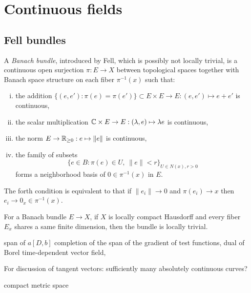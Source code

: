 \documentclass{../../large}
\begin{document}
\chapter{Continuous fields}


\section{Fell bundles}

\begin{prb}
A \emph{Banach bundle}, introduced by Fell, which is possibly not locally trivial, is a continuous open surjection $\pi:E\to X$ between topological spaces together with Banach space structure on each fiber $\pi^{-1}(x)$ such that:
\begin{enumerate}[(i)]
\item the addition $\{(e,e'):\pi(e)=\pi(e')\}\subset E\times E\to E:(e,e')\mapsto e+e'$ is continuous,
\item the scalar multiplication $\mathbb{C}\times E\to E:(\lambda,e)\mapsto\lambda e$ is continuous,
\item the norm $E\to\mathbb{R}_{\ge0}:e\mapsto\|e\|$ is continuous,
\item the family of subsets
\[\{e\in B:\pi(e)\in U,\ \|e\|<r\}_{U\in N(x),r>0}\]
forms a neighborhood basis of $0\in\pi^{-1}(x)$ in $E$.
\end{enumerate}
The forth condition is equivalent to that if $\|e_i\|\to0$ and $\pi(e_i)\to x$ then $e_i\to 0_x\in\pi^{-1}(x)$.
\begin{parts}
\item For a Banach bundle $E\to X$, if $X$ is locally compact Hausdorff and every fiber $E_x$ shares a same finite dimension, then the bundle is locally trivial.
\end{parts}
\end{prb}


\begin{prb}


\end{prb}




span of $a[D,b]$
completion of the span of the gradient of test functions,
dual of Borel time-dependent vector field,

For discussion of tangent vectors:
sufficiently many absolutely continuous curves?

compact metric space
\end{document}
